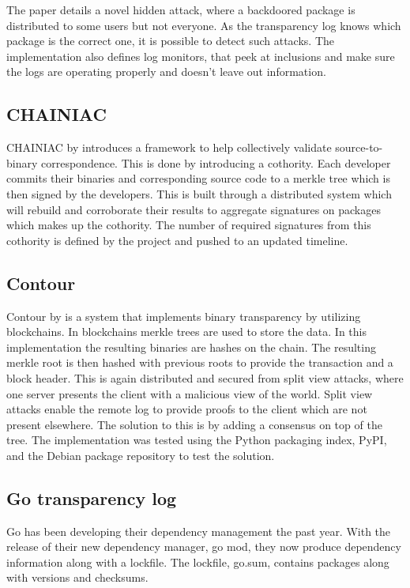 \documentclass[../Main/thesis.tex]{subfiles}
\begin{document}
The paper details a novel hidden attack, where a backdoored package is
distributed to some users but not everyone. As the transparency log knows which
package is the correct one, it is possible to detect such attacks. The
implementation also defines log monitors, that peek at inclusions and make
sure the logs are operating properly and doesn't leave out information.


\subsection{CHAINIAC}\label{sec:chainiac}
CHAINIAC by \citeauthor*{kirill-niktin-2017} introduces a framework to help
collectively validate source-to-binary correspondence\cite{kirill-niktin-2017}.
This is done by introducing a cothority.  Each developer commits their binaries
and corresponding source code to a merkle tree which is then signed by the
developers. This is built through a distributed system which will rebuild and
corroborate their results to aggregate signatures on packages which makes up the
cothority. The number of required signatures from this cothority is defined by
the project and pushed to an updated timeline.


\subsection{Contour}\label{sec:contour}
Contour by \citeauthor{1712.08427v2} is a system that implements binary
transparency by utilizing blockchains. In blockchains merkle trees are used to
store the data. In this implementation the resulting binaries are hashes on the
chain. The resulting merkle root is then hashed with previous roots to provide
the transaction and a block header. This is again distributed and secured from
split view attacks, where one server presents the client with a malicious view
of the world. Split view attacks enable the remote log to provide proofs to the
client which are not present elsewhere. The solution to this is by adding a
consensus on top of the tree. The implementation was tested using the Python
packaging index, PyPI, and the Debian package repository to test the
solution.\cite{1712.08427v2}


\subsection{Go transparency log}\label{sec:go-transparency-log}
Go has been developing their dependency management the past year. With the
release of their new dependency manager, go mod, they now produce dependency
information along with a lockfile. The lockfile, go.sum, contains packages along
with versions and checksums.
\end{document}
